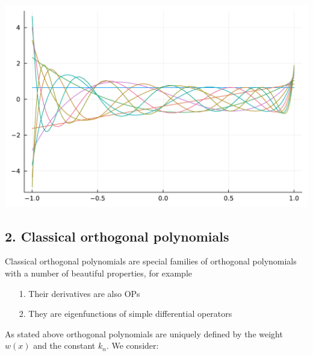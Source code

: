 \documentclass[12pt,a4paper]{article}
\begin{document}
\includegraphics[width=\linewidth]{jl_dOthw0/OP_methods_9_1.pdf}

\subsection{2. Classical orthogonal polynomials}
Classical orthogonal polynomials are special families of orthogonal polynomials with a number of beautiful properties, for example

\begin{itemize}
\item[1. ] Their derivatives are also OPs


\item[2. ] They are eigenfunctions of simple differential operators

\end{itemize}
As stated above orthogonal polynomials are uniquely defined by the weight $w(x)$ and the constant $k_n$. We consider:
\end{document}

